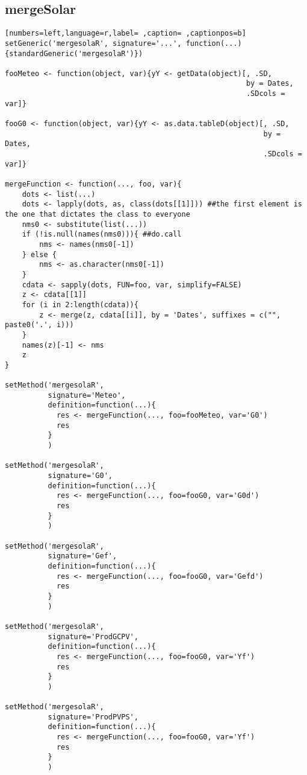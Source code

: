 \subsection{mergeSolar}
\label{sec:org845261b}
\begin{lstlisting}[numbers=left,language=r,label= ,caption= ,captionpos=b]
setGeneric('mergesolaR', signature='...', function(...){standardGeneric('mergesolaR')})

fooMeteo <- function(object, var){yY <- getData(object)[, .SD,
                                                        by = Dates,
                                                        .SDcols = var]}

fooG0 <- function(object, var){yY <- as.data.tableD(object)[, .SD,
                                                            by = Dates,
                                                            .SDcols = var]}

mergeFunction <- function(..., foo, var){
    dots <- list(...)
    dots <- lapply(dots, as, class(dots[[1]])) ##the first element is the one that dictates the class to everyone
    nms0 <- substitute(list(...))
    if (!is.null(names(nms0))){ ##do.call
        nms <- names(nms0[-1])
    } else { 
        nms <- as.character(nms0[-1])
    }
    cdata <- sapply(dots, FUN=foo, var, simplify=FALSE)
    z <- cdata[[1]]
    for (i in 2:length(cdata)){
        z <- merge(z, cdata[[i]], by = 'Dates', suffixes = c("", paste0('.', i)))
    }
    names(z)[-1] <- nms
    z
}

setMethod('mergesolaR',
          signature='Meteo',
          definition=function(...){
            res <- mergeFunction(..., foo=fooMeteo, var='G0')
            res
          }
          )

setMethod('mergesolaR',
          signature='G0',
          definition=function(...){
            res <- mergeFunction(..., foo=fooG0, var='G0d')
            res
          }
          )

setMethod('mergesolaR',
          signature='Gef',
          definition=function(...){
            res <- mergeFunction(..., foo=fooG0, var='Gefd')
            res
          }
          )

setMethod('mergesolaR',
          signature='ProdGCPV',
          definition=function(...){
            res <- mergeFunction(..., foo=fooG0, var='Yf')
            res
          }
          )

setMethod('mergesolaR',
          signature='ProdPVPS',
          definition=function(...){
            res <- mergeFunction(..., foo=fooG0, var='Yf')
            res
          }
          )
\end{lstlisting}
